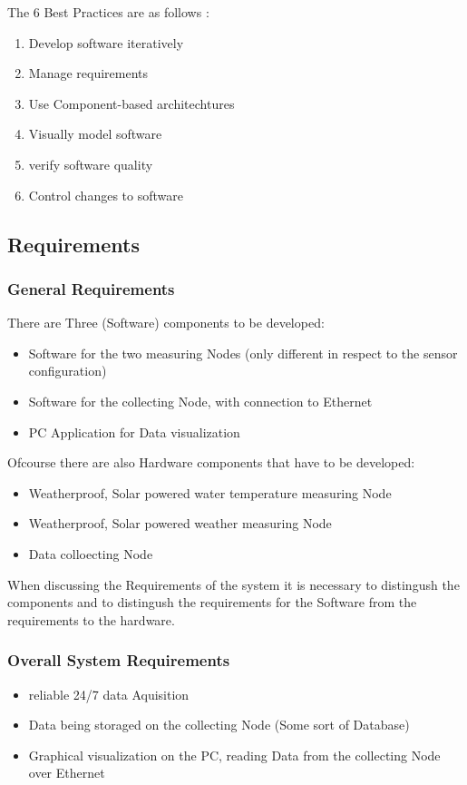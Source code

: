 \documentclass[
	11pt,
	a4paper
]{article}%
\begin{document}
The 6 Best Practices are as follows :
\begin{enumerate}
\item Develop software iteratively
\item Manage requirements
\item Use Component-based architechtures
\item Visually model software
\item verify software quality
\item Control changes to software
\end{enumerate}

\subsection{Requirements}
\subsubsection{General Requirements}
There are Three (Software) components to be developed:
\begin{itemize}
\item Software for the two measuring Nodes (only different in respect to the sensor configuration)
\item Software for the collecting Node, with connection to Ethernet
\item PC Application for Data visualization
\end{itemize}
Ofcourse there are also Hardware components that have to be developed:
\begin{itemize}
\item Weatherproof, Solar powered water temperature measuring Node
\item Weatherproof, Solar powered weather measuring Node
\item Data colloecting Node
\end{itemize} 
When discussing the Requirements of the system it is necessary to distingush the components and to distingush the requirements for the Software from the requirements to the hardware.

\subsubsection{Overall System Requirements}
\begin{itemize}
\item reliable 24/7 data Aquisition
\item Data being storaged on the collecting Node (Some sort of Database)
\item Graphical visualization on the PC, reading Data from the collecting Node over Ethernet
\end{itemize}
\end{document}
